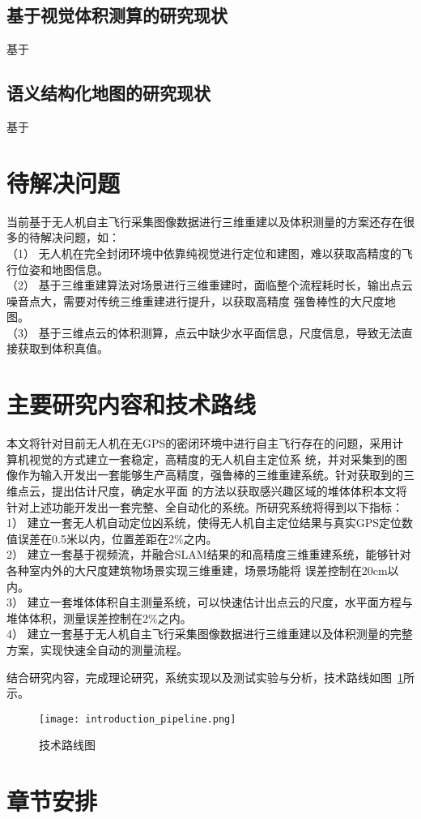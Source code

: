 \subsection{基于视觉体积测算的研究现状}
\label{sec:1.2.3}
基于
\subsection{语义结构化地图的研究现状}
\label{sec:1.2.4}
基于
\section{待解决问题}
\label{sec:1.3}
当前基于无人机自主飞行采集图像数据进行三维重建以及体积测量的方案还存在很多的待解决问题，如：\\
（1）	无人机在完全封闭环境中依靠纯视觉进行定位和建图，难以获取高精度的飞行位姿和地图信息。\\
（2）	基于三维重建算法对场景进行三维重建时，面临整个流程耗时长，输出点云噪音点大，需要对传统三维重建进行提升，以获取高精度
强鲁棒性的大尺度地图。\\
（3）	基于三维点云的体积测算，点云中缺少水平面信息，尺度信息，导致无法直接获取到体积真值。
\section{主要研究内容和技术路线}
\label{sec:1.4}
本文将针对目前无人机在无GPS的密闭环境中进行自主飞行存在的问题，采用计算机视觉的方式建立一套稳定，高精度的无人机自主定位系
统，并对采集到的图像作为输入开发出一套能够生产高精度，强鲁棒的三维重建系统。针对获取到的三维点云，提出估计尺度，确定水平面
的方法以获取感兴趣区域的堆体体积本文将针对上述功能开发出一套完整、全自动化的系统。所研究系统将得到以下指标：\\
1）	建立一套无人机自动定位凶系统，使得无人机自主定位结果与真实GPS定位数值误差在0.5米以内，位置差距在2$\%$之内。\\
2）	建立一套基于视频流，并融合SLAM结果的和高精度三维重建系统，能够针对各种室内外的大尺度建筑物场景实现三维重建，场景场能将
误差控制在20cm以内。\\
3）	建立一套堆体体积自主测量系统，可以快速估计出点云的尺度，水平面方程与堆体体积，测量误差控制在2$\%$之内。\\
4）	建立一套基于无人机自主飞行采集图像数据进行三维重建以及体积测量的完整方案，实现快速全自动的测量流程。

结合研究内容，完成理论研究，系统实现以及测试实验与分析，技术路线如图~\ref{fig:introduction_pipeline}所示。
\begin{figure}[H] %
  \centering
  \texttt{[image: introduction\_pipeline.png]}
  \caption{技术路线图}
  \label{fig:introduction_pipeline}
\end{figure}
\section{章节安排}
\label{sec:1.4}

